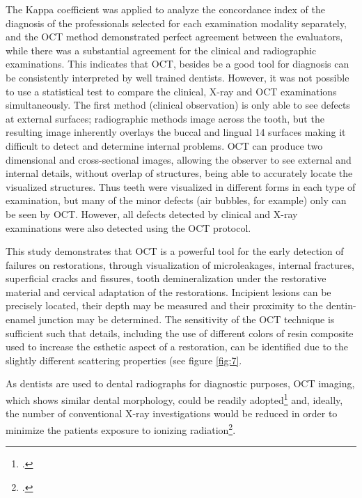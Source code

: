 \documentclass[12pt,twoside,english]{book}
\renewcommand{\~}{\perispomeni}%
\numberwithin{equation}{section}
\numberwithin{figure}{section}
\begin{document}
The Kappa coefficient was applied to analyze the concordance index of the diagnosis of the professionals selected for each examination modality separately, and the OCT method demonstrated perfect agreement between the evaluators, while there was a substantial agreement for the clinical and radiographic examinations. This indicates that OCT, besides be a good tool for diagnosis can be consistently interpreted by well trained dentists. However, it was not possible to use a statistical test to compare the clinical, X-ray and OCT examinations simultaneously. The first method (clinical observation) is only able to see defects at external surfaces; radiographic methods image across the tooth, but the resulting image inherently overlays the buccal and lingual 14 surfaces making it difficult to detect and determine internal problems. OCT can produce two dimensional and cross-sectional images, allowing the observer to see external and internal details, without overlap of structures, being able to accurately locate the visualized structures. Thus teeth were visualized in different forms in each type of examination, but many of the minor defects (air bubbles, for example) only can be seen by OCT. However, all defects detected by clinical and X-ray examinations were also detected using the OCT protocol.

This study demonstrates that OCT is a powerful tool for the early detection of failures on restorations, through visualization of microleakages, internal fractures, superficial cracks and fissures, tooth demineralization under the restorative material and cervical adaptation of the restorations. Incipient lesions can be precisely located, their depth may be measured and their proximity to the dentin-enamel junction may be determined. The sensitivity of the OCT technique is sufficient such that details, including the use of different colors of resin composite used to increase the esthetic aspect of a restoration, can be identified due to the slightly different scattering properties (see figure \ref{fig:7}.

As dentists are used to dental radiographs for diagnostic purposes, OCT imaging, which shows similar dental morphology, could be readily adopted\footcite{ChooSmith:2008p1834} and, ideally, the number of conventional X-ray investigations would be reduced in order to minimize the patients exposure to ionizing radiation\footcite{Brandenburg:2003p2055}.
\end{document}
